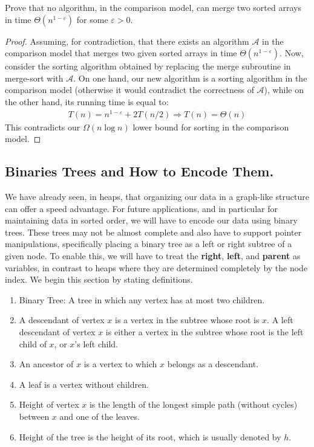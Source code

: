\begin{example}
  Prove that no algorithm, in the comparison model, can merge two sorted arrays in time $\Theta(n^{1-\varepsilon})$ for some $\varepsilon>0$.
\end{example}
\begin{proof}
 Assuming, for contradiction, that there exists an algorithm $\mathcal{A}$ in the comparison model that merges two given sorted arrays in time $\Theta\left( n^{1-\varepsilon} \right)$. Now, consider the sorting algorithm obtained by replacing the merge subroutine in merge-sort with $\mathcal{A}$. On one hand, our new algorithm is a sorting algorithm in the comparison model (otherwise it would contradict the correctness of $\mathcal{A}$), while on the other hand, its running time is equal to:
  \begin{equation*}
    \begin{split}
      T(n) = n^{1-\varepsilon} + 2T(n/2) \Rightarrow T(n) = \Theta(n)
    \end{split}
  \end{equation*}
  This contradicts our $\Omega(n\log n)$ lower bound for sorting in the comparison model.
\end{proof}

\newpage

\subsection{Binaries Trees and How to Encode Them. } We have already seen, in heaps, that organizing our data in a graph-like structure can offer a speed advantage. For future applications, and in particular for maintaining data in sorted order, we will have to encode our data using binary trees. These trees may not be almost complete and also have to support pointer manipulations, specifically placing a binary tree as a left or right subtree of a given node. To enable this, we will have to treat the \textbf{right}, \textbf{left}, and \textbf{parent} as variables, in contrast to heaps where they are determined completely by the node index. We begin this section by stating definitions.


\begin{definition}
  \begin{enumerate}
    \item Binary Tree: A tree in which any vertex has at most two children.
    \item A descendant of vertex $x$ is a vertex in the subtree whose root is $x$. A left descendant of vertex $x$ is either a vertex in the subtree whose root is the left child of $x$, or $x$'s left child.
    \item An ancestor of $x$ is a vertex to which $x$ belongs as a descendant.
    \item A leaf is a vertex without children.
    \item Height of vertex $x$ is the length of the longest simple path (without cycles) between $x$ and one of the leaves.
    \item Height of the tree is the height of its root, which is usually denoted by $h$.
\end{enumerate}
\end{definition}

